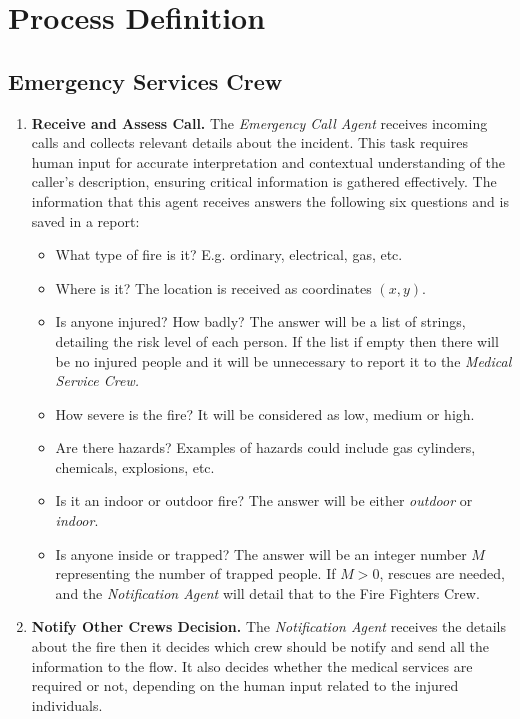 \section{Process Definition}

\subsection{Emergency Services Crew}
\begin{enumerate}

    \item \textbf{Receive and Assess Call.} 
    The \textit{Emergency Call Agent} receives incoming calls and collects relevant details about the incident. 
    This task requires human input for accurate interpretation and contextual understanding of the caller's description, 
    ensuring critical information is gathered effectively. The information that this agent receives answers the following 
    six questions and is saved in a report:
    \begin{itemize}
        \item What type of fire is it? E.g. ordinary, electrical, gas, etc.
        \item Where is it? The location is received as coordinates \((x, y)\).
        \item Is anyone injured? How badly? The answer will be a list of strings, detailing the risk level of each person. If the list 
        if empty then there will be no injured people and it will be unnecessary to report it to the \textit{Medical Service Crew.}
        \item How severe is the fire? It will be considered as low, medium or high.
        \item Are there hazards? Examples of hazards could include gas cylinders, chemicals, explosions, etc.
        \item Is it an indoor or outdoor fire? The answer will be either \textit{outdoor} or \textit{indoor}.
        \item Is anyone inside or trapped? The answer will be an integer number $M$ representing the number of trapped people. 
        If $M > 0$, rescues are needed, and the \textit{Notification Agent} will detail that to the Fire Fighters Crew.
    \end{itemize}
    

    \item \textbf{Notify Other Crews Decision.} 
    The \textit{Notification Agent} receives the details about the fire then it decides which crew should be notify and send
    all the information to the flow. It also decides whether the medical services are required or not, depending on the 
    human input related to the injured individuals.    

\end{enumerate}


